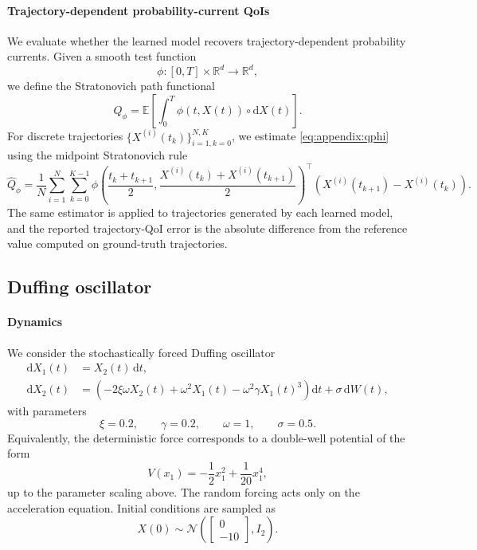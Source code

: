 \documentclass[oneside,11pt]{article}
\theoremstyle{remark}
\begin{document}
\paragraph{Trajectory-dependent probability-current QoIs}
We evaluate whether the learned model
recovers trajectory-dependent probability currents.  Given a smooth test
function
\[
    \phi : [0,T]\times \mathbb{R}^d \to \mathbb{R}^d,
\]
we define the Stratonovich path functional
\begin{equation}
    Q_\phi
    =
    \mathbb{E}\left[
    \int_0^T
    \phi(t,X(t)) \circ \mathrm dX(t)
    \right].
    \label{eq:appendix:qphi}
\end{equation}
For discrete trajectories
$\{X^{(i)}(t_k)\}_{i=1,k=0}^{N,K}$, we estimate \eqref{eq:appendix:qphi}
using the midpoint Stratonovich rule
\begin{equation}
    \widehat Q_\phi
    =
    \frac{1}{N}
    \sum_{i=1}^N
    \sum_{k=0}^{K-1}
    \phi\!\left(
        \frac{t_k+t_{k+1}}{2},
        \frac{X^{(i)}(t_k)+X^{(i)}(t_{k+1})}{2}
    \right)^\top
    \left(
        X^{(i)}(t_{k+1})-X^{(i)}(t_k)
    \right).
    \label{eq:appendix:qphi-discrete}
\end{equation}
The same estimator is applied to trajectories generated by each learned
model, and the reported trajectory-QoI error is the absolute difference from
the reference value computed on ground-truth trajectories.

\subsection{Duffing oscillator}\label{appendix:DuffingDetails}

\paragraph{Dynamics}
We consider the stochastically forced Duffing oscillator
\begin{align}
    \mathrm dX_1(t) &= X_2(t)\,\mathrm dt, \\
    \mathrm dX_2(t) &=
    \left(
        -2\xi\omega X_2(t)
        + \omega^2 X_1(t)
        - \omega^2\gamma X_1(t)^3
    \right)\mathrm dt
    + \sigma\,\mathrm dW(t),
\end{align}
with parameters
\[
    \xi = 0.2,
    \qquad
    \gamma = 0.2,
    \qquad
    \omega = 1,
    \qquad
    \sigma = 0.5.
\]
Equivalently, the deterministic force corresponds to a double-well potential
of the form
\[
    V(x_1) = -\frac12 x_1^2 + \frac{1}{20}x_1^4,
\]
up to the parameter scaling above.  The random forcing acts only on the
acceleration equation.  Initial conditions are sampled as
\[
    X(0) \sim
    \mathcal N
    \left(
        \begin{bmatrix}0 \\ -10\end{bmatrix},
        I_2
    \right).
\]
\end{document}
